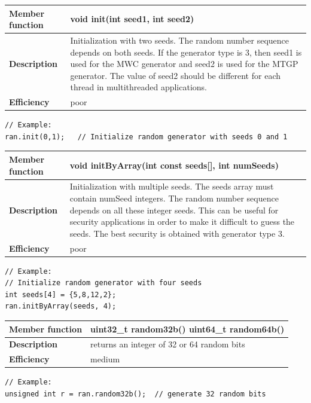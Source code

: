 \documentclass[11pt,a4paper,oneside,openright]{report}
\newcommand{\vspacesmall}{\vspace{3mm}}
\begin{document}
\begin{tabular}{|p{30mm}|p{100mm}|}
\hline
\bfseries Member function & void init(int seed1, int seed2) \\ \hline
\bfseries Description & Initialization with two seeds. The random number sequence depends on both seeds. If the generator type is 3, then seed1 is used for the MWC generator and seed2 is used for the MTGP generator. The value of seed2 should be different for each thread in multithreaded applications. \\ \hline
\bfseries Efficiency & poor \\ \hline
\end{tabular}
\begin{lstlisting}[frame=none]
// Example:
ran.init(0,1);   // Initialize random generator with seeds 0 and 1
\end{lstlisting}
\vspacesmall

\begin{tabular}{|p{30mm}|p{100mm}|}
\hline
\bfseries Member function & void initByArray(int const seeds[], int numSeeds) \\ \hline
\bfseries Description & Initialization with multiple seeds. The seeds array must contain numSeed integers. The random number sequence depends on all these integer seeds. This can be useful for security applications in order to make it difficult to guess the seeds. The best security is obtained with generator type 3. \\ \hline
\bfseries Efficiency & poor \\ \hline
\end{tabular}
\begin{lstlisting}[frame=none]
// Example:
// Initialize random generator with four seeds
int seeds[4] = {5,8,12,2};
ran.initByArray(seeds, 4);  
\end{lstlisting}
\vspacesmall

\begin{tabular}{|p{30mm}|p{100mm}|}
\hline
\bfseries Member function & uint32\_t random32b()\newline
uint64\_t random64b() \\ \hline
\bfseries Description & returns an integer of 32 or 64 random bits \\ \hline
\bfseries Efficiency & medium \\ \hline
\end{tabular}
\begin{lstlisting}[frame=none]
// Example:
unsigned int r = ran.random32b();  // generate 32 random bits
\end{lstlisting}
\vspacesmall
\end{document}
